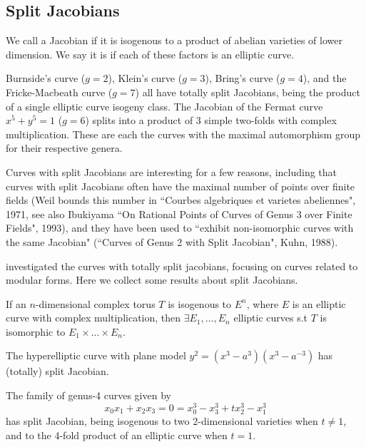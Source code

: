 \documentclass{article}
\begin{document}
\subsection{Split Jacobians}
\begin{definition}
	We call a Jacobian  if it is isogenous to a product of abelian varieties of lower dimension. We say it is  if each of these factors is an elliptic curve. 
\end{definition}
\begin{example}
	Burnside's curve ($g=2$), Klein's curve ($g=3$), Bring's curve ($g=4$), and the Fricke-Macbeath curve ($g=7$) all have totally split Jacobians, being the product of a single elliptic curve isogeny class. The Jacobian of the Fermat curve $x^5+y^5=1$ ($g=6$) splits into a product of 3 simple two-folds with complex multiplication. These are each the curves with the maximal automorphism group for their respective genera.  
\end{example}

Curves with split Jacobians are interesting for a few reasons, including that curves with split Jacobians often have the maximal number of points over finite fields (Weil bounds this number in ``Courbes algebriques et varietes abeliennes", 1971, see also Ibukiyama ``On Rational Points of Curves of Genus 3 over Finite Fields", 1993), and they have been used to ``exhibit non-isomorphic curves with the same Jacobian" (``Curves of Genus 2 with Split Jacobian", Kuhn, 1988). 


\cite{Ekedahl1993} investigated the curves with totally split jacobians, focusing on curves related to modular forms. Here we collect some results about split Jacobians. 

\begin{theorem}
	If an $n$-dimensional complex torus $T$ is isogenous to $E^n$, where $E$ is an elliptic curve with complex multiplication, then $\exists E_1, \dots, E_n$ elliptic curves s.t $T$ is isomorphic to $E_1 \times \dots \times E_n$. 
\end{theorem}

\begin{theorem}
	The hyperelliptic curve with plane model $y^2 = (x^3 - a^3)(x^3 - a^{-3})$ has (totally) split Jacobian. 
\end{theorem}

\begin{theorem}
	The family of genus-4 curves given by 
	\[
	x_0 x_1 + x_2 x_3 = 0 = x_0^3 - x_3^3 + tx_2^3 - x_1^3
	\]
	has split Jacobian, being isogenous to two 2-dimensional varieties when $t \neq 1$, and to the 4-fold product of an elliptic curve when $t=1$. 
\end{theorem}
\end{document}
